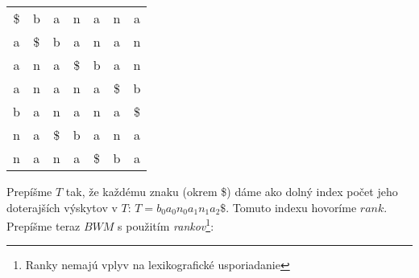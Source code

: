     \bigskip
    \begin{center}
        \begin{tabular}{ c c c c c c c }
            \$ & b  & a  & n  & a  & n  & a  \\            
            a  & \$ & b  & a  & n  & a  & n  \\
            a  & n  & a  & \$ & b  & a  & n  \\
            a  & n  & a  & n  & a  & \$ & b  \\
            b  & a  & n  & a  & n  & a  & \$ \\
            n  & a  & \$ & b  & a  & n  & a  \\ 
            n  & a  & n  & a  & \$ & b  & a  \\
        \end{tabular}
    \end{center}    
    
    Prepíšme $T$ tak, že každému znaku (okrem \$) dáme ako dolný index počet jeho doterajších výskytov v $T$: $T = b_0a_0n_0a_{1}n_{1}a_{2}\$$. Tomuto indexu hovoríme $rank$. Prepíšme teraz $BWM$ s použitím \emph{rankov}\footnote{Ranky nemajú vplyv na lexikografické usporiadanie}:
    
